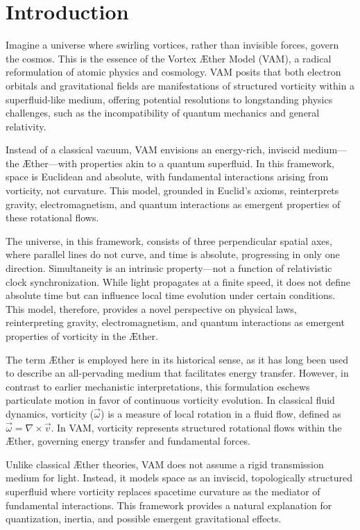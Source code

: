 \documentclass[a4paper,10pt]{article}
\begin{document}
    \newpage 

\section*{Introduction}
Imagine a universe where swirling vortices, rather than invisible forces, govern the cosmos. This is the essence of the Vortex Æther Model (VAM), a radical reformulation of atomic physics and cosmology. VAM posits that both electron orbitals and gravitational fields are manifestations of structured vorticity within a superfluid-like medium, offering potential resolutions to longstanding physics challenges, such as the incompatibility of quantum mechanics and general relativity.

Instead of a classical vacuum, VAM envisions an energy-rich, inviscid medium—the Æther—with properties akin to a quantum superfluid. In this framework, space is Euclidean and absolute, with fundamental interactions arising from vorticity, not curvature. This model, grounded in Euclid's axioms, reinterprets gravity, electromagnetism, and quantum interactions as emergent properties of these rotational flows.


The universe, in this framework, consists of three perpendicular spatial axes, where parallel lines do not curve, and time is absolute, progressing in only one direction. Simultaneity is an intrinsic property—not a function of relativistic clock synchronization. While light propagates at a finite speed, it does not define absolute time but can influence local time evolution under certain conditions. This model, therefore, provides a novel perspective on physical laws, reinterpreting gravity, electromagnetism, and quantum interactions as emergent properties of vorticity in the Æther.


The term Æther is employed here in its historical sense, as it has long been used to describe an all-pervading medium that facilitates energy transfer.
However, in contrast to earlier mechanistic interpretations, this formulation eschews particulate motion in favor of continuous vorticity evolution. In classical fluid dynamics, vorticity ($\vec{\omega}$) is a measure of local rotation in a fluid flow, defined as $\vec{\omega} = \nabla \times \vec{v}$. In VAM, vorticity represents structured rotational flows within the Æther, governing energy transfer and fundamental forces.

Unlike classical Æther theories, VAM does not assume a rigid transmission medium for light. Instead, it models space as an inviscid, topologically structured superfluid where vorticity replaces spacetime curvature as the mediator of fundamental interactions. This framework provides a natural explanation for quantization, inertia, and possible emergent gravitational effects.
\end{document}
